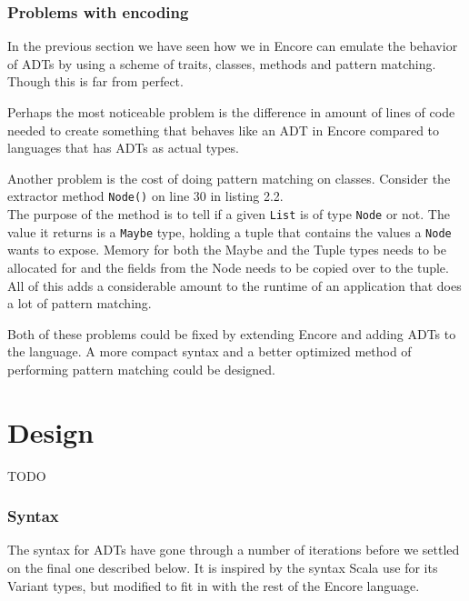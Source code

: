\documentclass[10pt]{report}
\begin{document}
\subsection{Problems with encoding}
\par{\noindent In the previous section we have seen how we in Encore can emulate the behavior of ADTs by using a scheme of traits, classes, methods and pattern matching. Though this is far from perfect.\\}
\par{\noindent Perhaps the most noticeable problem is the difference in amount of lines of code needed to create something that behaves like an ADT in Encore compared to languages that has ADTs as actual types.\\}
\par{\noindent Another problem is the cost of doing pattern matching on classes. Consider the extractor method \texttt{Node()} on line 30 in listing 2.2.\\ The purpose of the method is to tell if a given \texttt{List} is of type \texttt{Node} or not. The value it returns is a \texttt{Maybe} type, holding a tuple that contains the values a \texttt{Node} wants to expose. Memory for both the Maybe and the Tuple types needs to be allocated for and the fields from the Node needs to be copied over to the tuple. All of this adds a considerable amount to the runtime of an application that does a lot of pattern matching.\\}
\par{\noindent Both of these problems could be fixed by extending Encore and adding ADTs to the language. A more compact syntax and a better optimized method of performing pattern matching could be designed.}
\chapter{Design}
TODO
\subsection{Syntax}
\par{\noindent The syntax for ADTs have gone through a number of iterations before we settled on the final one described below.  It is inspired by the syntax Scala use for its Variant types, but modified to fit in with the rest of the Encore language.\\}
\end{document}
